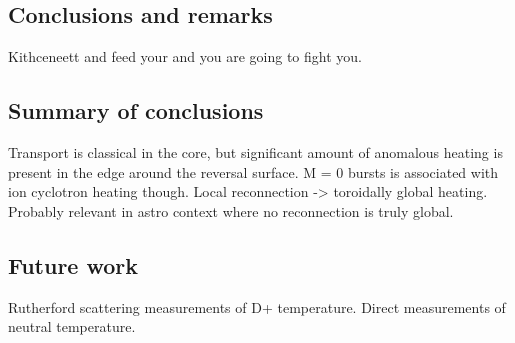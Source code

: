 \begin{refsection}


\chapter{Conclusions and remarks}

Kithceneett and feed your and you are going to fight you.

\section{Summary of conclusions}

Transport is classical in the core, but significant amount of anomalous heating is present in the edge around the reversal surface. M = 0 bursts is associated with ion cyclotron heating though. Local reconnection -> toroidally global heating. Probably relevant in astro context where no reconnection is truly global. 

\section{Future work}

Rutherford scattering measurements of D+ temperature. 
Direct measurements of neutral temperature. 


\printbibliography
\end{refsection}